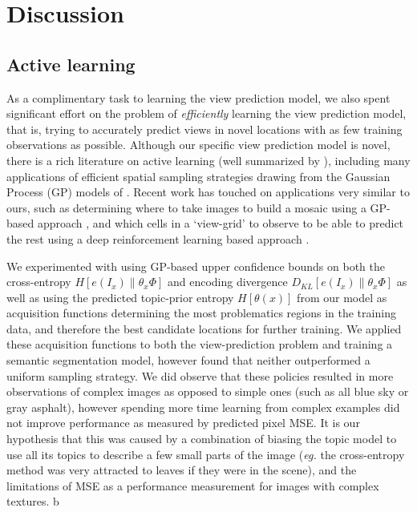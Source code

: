 \section{Discussion}

\subsection{Active learning}\label{sec:active-learning}
As a complimentary task to learning the view prediction model, we also spent significant effort on the problem of \emph{efficiently} learning the view prediction model, that is, trying to accurately predict views in novel locations with as few training observations as possible. Although our specific view prediction model is novel, there is a rich literature on active learning (well summarized by \citep{settles2012active}), including many applications of efficient spatial sampling strategies drawing from the Gaussian Process (GP) models of \citep{Seo2000,guestrin2005near}. Recent work has touched on applications very similar to ours, such as determining where to take images to build a mosaic using a GP-based approach \citep{sandeep_crv_2016}, and which cells in a `view-grid' to observe to be able to predict the rest using a deep reinforcement learning based approach \citep{Jayaraman2017}.

We experimented with using GP-based upper confidence bounds on both the cross-entropy $H\left[e(I_x) \| \theta_x\Phi \right]$ and encoding divergence $D_{KL}\left[e(I_x) \| \theta_x\Phi\right]$ as well as using the predicted topic-prior entropy $H\left[\theta(x)\right]$ from our model as acquisition functions determining the most problematics regions in the training data, and therefore the best candidate locations for further training. We applied these acquisition functions to both the view-prediction problem and training a semantic segmentation model, however found that neither outperformed a uniform sampling strategy. We did observe that these policies resulted in more observations of complex images as opposed to simple ones (such as all blue sky or gray asphalt), however spending more time learning from complex examples did not improve performance as measured by predicted pixel MSE. It is our hypothesis that this was caused by a combination of biasing the topic model to use all its topics to describe a few small parts of the image (\emph{eg.} the cross-entropy method was very attracted to leaves if they were in the scene), and the limitations of MSE as a performance measurement for images with complex textures.
b
